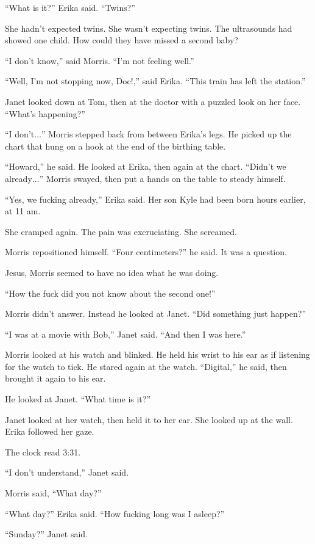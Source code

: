 ``What is it?'' Erika said. ``Twins?''

She hadn't expected twins. She wasn't expecting twins. The ultrasounds had showed one child. How could they have missed a second baby?

``I don't know,'' said Morris. ``I'm not feeling well.''

``Well, I'm not stopping now, Doc!,'' said Erika. ``This train has left the station.''

Janet looked down at Tom, then at the doctor with a puzzled look on her face. ``What's happening?''

``I don't$\ldots$'' Morris stepped back from between Erika's legs. He picked up the chart that hung on a hook at the end of the birthing table.

``Howard,'' he said. He looked at Erika, then again at the chart. ``Didn't we already$\ldots$'' Morris swayed, then put a hands on the table to steady himself.

``Yes, we fucking already,'' Erika said. Her son Kyle had been born hours earlier, at 11 am.

She cramped again. The pain was excruciating. She screamed.

Morris repositioned himself. ``Four centimeters?'' he said. It was a question.

Jesus, Morris seemed to have no idea what he was doing.

``How the fuck did you not know about the second one!''

Morris didn't answer. Instead he looked at Janet. ``Did something just happen?''

``I was at a movie with Bob,'' Janet said. ``And then I was here.''

Morris looked at his watch and blinked. He held his wrist to his ear as if listening for the watch to tick. He stared again at the watch. ``Digital,'' he said, then brought it again to his ear.

He looked at Janet. ``What time is it?''

Janet looked at her watch, then held it to her ear. She looked up at the wall. Erika followed her gaze.

The clock read 3:31.

``I don't understand,'' Janet said.

Morris said, ``What day?''

``What day?'' Erika said. ``How fucking long was I asleep?''

``Sunday?'' Janet said.

